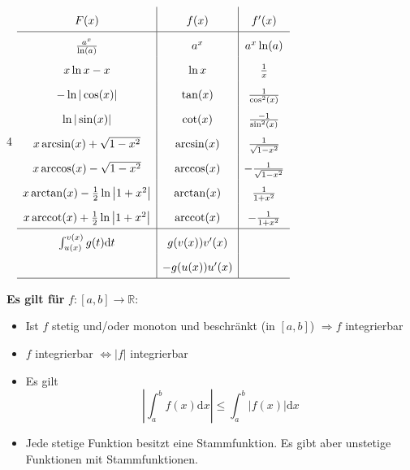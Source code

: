 \documentclass[6pt,a4paper]{scrartcl}
\newcommand{\abs}[1]{\ensuremath{\left\vert#1\right\vert}}
\DeclareMathOperator{\arccot}{arccot}
\begin{document}
\begin{multicols*}{4}
	\everymath{\displaystyle}	%
	\begin{math}\renewcommand{\arraystretch}{1.8}
		\begin{array}{c|c|c}
			F(x)                                               & f(x)          & f'(x)                   \\ \hline
			\frac{a^x}{\ln(a)}                                 & a^x           & a^x \ln(a)              \\
			x\ln x - x                                         & \ln x         & \frac{1}{x}             \\
			-\ln |\cos(x)|                                     & \tan(x)       & \frac{1}{\cos^2(x)}     \\
			\ln |\sin(x)|                                      & \cot(x)       & \frac{-1}{\sin^2(x)}    \\
			x\arcsin (x)+\sqrt{1-x^2}                          & \arcsin(x)    & \frac{1}{\sqrt{1-x^2}}  \\
			x\arccos (x)-\sqrt{1-x^2}                          & \arccos(x)    & -\frac{1}{\sqrt{1-x^2}} \\
			x\arctan (x)-\frac{1}{2} \ln \left| 1+ x^2 \right| & \arctan (x)   & \frac{1}{1+x^2}         \\
			x\arccot (x)+\frac{1}{2} \ln \left| 1+ x^2 \right| & \arccot (x)   & -\frac{1}{1+x^2}        \\ \hline
			\int_{u(x)}^{v(x)}g(t) \mathrm dt                  & g(v(x))v'(x)  &                         \\
			                                                   & -g(u(x))u'(x) &                         \\ \hline
		\end{array}
	\end{math}
	\everymath{\textstyle}

	\begin{sectionbox}
		\textbf{Es gilt für} $f:[a,b] \rightarrow \mathbb R$:
		\begin{itemize}\itemsep0pt
			\item Ist $f$ stetig und/oder monoton und beschränkt (in $[a,b]$) $\Rightarrow f$ integrierbar
			\item $f$ integrierbar $\Leftrightarrow |f|$ integrierbar
			\item Es gilt \begin{equation*}
				      \abs{\int_{a}^{b}f(x)\mathrm dx} \le \int_{a}^{b}\abs{f(x)}\mathrm dx
			      \end{equation*}
			\item Jede stetige Funktion besitzt eine Stammfunktion. Es gibt aber unstetige Funktionen mit Stammfunktionen.
		\end{itemize}
	\end{sectionbox}


\end{multicols*}
\end{document}
